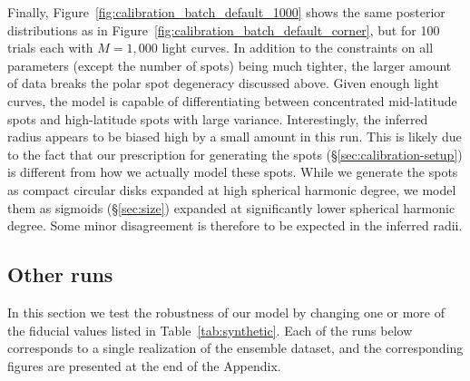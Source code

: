 \documentclass[modern]{aastex62}
\begin{document}
Finally, Figure~\ref{fig:calibration_batch_default_1000} shows
the same posterior distributions as in Figure~\ref{fig:calibration_batch_default_corner},
but for 100 trials each with $M=1{,}000$ light curves. In addition to the
constraints on all parameters (except the number of spots) being much
tighter, the larger amount of data breaks the polar spot degeneracy discussed
above. Given enough light curves, the model is capable of differentiating between
concentrated mid-latitude spots and high-latitude spots with large variance.
Interestingly, the inferred radius appears to be biased high by a small amount
in this run. This is likely due to the fact that our prescription for
generating the spots (\S\ref{sec:calibration-setup}) is different from how
we actually model these spots. While we generate the spots as compact
circular disks expanded at high spherical harmonic degree, we model them
as sigmoids (\S\ref{sec:size}) expanded at significantly lower spherical
harmonic degree. Some minor disagreement is therefore to be expected in the inferred
radii.

\subsection{Other runs}
In this section we test the robustness of our model by changing one or
more of the fiducial values listed in Table~\ref{tab:synthetic}.
Each of the runs below corresponds to a single realization of the ensemble
dataset, and the corresponding figures are presented at the end of the Appendix.
\end{document}
